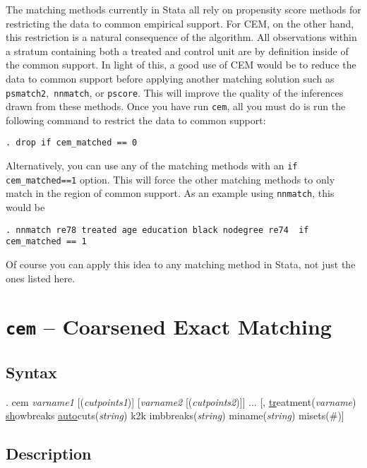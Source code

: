 \documentclass[11pt,titlepage]{article}
\begin{document}
The matching methods currently in Stata all rely on propensity score
methods for restricting the data to common empirical support. For CEM, on
the other hand, this restriction is a natural consequence of the
algorithm. All observations within a stratum containing both a treated and
control unit are by definition inside of the common support. In light of
this, a good use of CEM would be to reduce the data to common support
before applying another matching solution such as
\texttt{psmatch2},\texttt{ nnmatch}, or \texttt{pscore}. This will improve
the quality of the inferences drawn from these methods. Once you have run
\texttt{cem}, all you must do is run the following command to restrict the
data to common support:

\begin{verbatim}
. drop if cem_matched == 0
\end{verbatim}

Alternatively, you can use any of the matching methods with an 
\texttt{if cem\_matched==1} option. This will force the other matching 
methods to only match in the region of common support. As an example using
\texttt{nnmatch}, this would be

\begin{verbatim}
. nnmatch re78 treated age education black nodegree re74  if cem_matched == 1
\end{verbatim}
Of course  you can apply this idea to any matching method in Stata, not
just the ones listed here. 

\section{\texttt{cem} -- Coarsened Exact Matching}

\subsection{Syntax}

.  cem {\it varname1} [({\it cutpoints1})] [{\it varname2}
    [({\it cutpoints2})]] ... [, 
    \underline{tr}eatment({\it varname}) \underline{sh}owbreaks 
    \underline{auto}cuts({\it string}) k2k imbbreaks({\it string}) 
    miname({\it string}) misets(\#)]

\subsection{Description}
\end{document}
